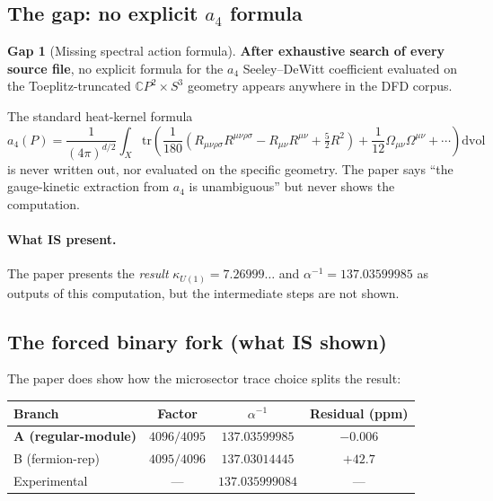 \documentclass[12pt,a4paper]{article}
\theoremstyle{definition}
\newtheorem{gap}{Gap}
\begin{document}
\subsection{The gap: no explicit $a_4$ formula}

\begin{gap}[Missing spectral action formula]
\label{gap:a4}
\textbf{After exhaustive search of every source file}, no explicit formula
for the $a_4$ Seeley--DeWitt coefficient evaluated on the Toeplitz-truncated
$\mathbb{C}P^2 \times S^3$ geometry appears anywhere in the DFD corpus.

The standard heat-kernel formula
\begin{equation}
a_4(P) = \frac{1}{(4\pi)^{d/2}} \int_X \mathrm{tr}\!\left(
\frac{1}{180}(R_{\mu\nu\rho\sigma}R^{\mu\nu\rho\sigma}
- R_{\mu\nu}R^{\mu\nu} + \tfrac{5}{2}R^2)
+ \frac{1}{12}\Omega_{\mu\nu}\Omega^{\mu\nu}
+ \cdots \right) \mathrm{dvol}
\end{equation}
is never written out, nor evaluated on the specific geometry.
The paper says ``the gauge-kinetic extraction from $a_4$ is unambiguous''
but never shows the computation.
\end{gap}

\paragraph{What IS present.}
The paper presents the \emph{result} $\kappa_{U(1)} = 7.26999\ldots$
and $\alpha^{-1} = 137.03599985$ as outputs of this computation,
but the intermediate steps are not shown.

\subsection{The forced binary fork (what IS shown)}

The paper does show how the microsector trace choice splits the result:

\begin{center}
\renewcommand{\arraystretch}{1.3}
\begin{tabular}{lccc}
\toprule
Branch & Factor & $\alpha^{-1}$ & Residual (ppm) \\
\midrule
\textbf{A (regular-module)} & $4096/4095$ & $137.03599985$ & $-0.006$ \\
B (fermion-rep) & $4095/4096$ & $137.03014445$ & $+42.7$ \\
\midrule
Experimental & --- & $137.035999084$ & --- \\
\bottomrule
\end{tabular}
\end{center}
\end{document}
